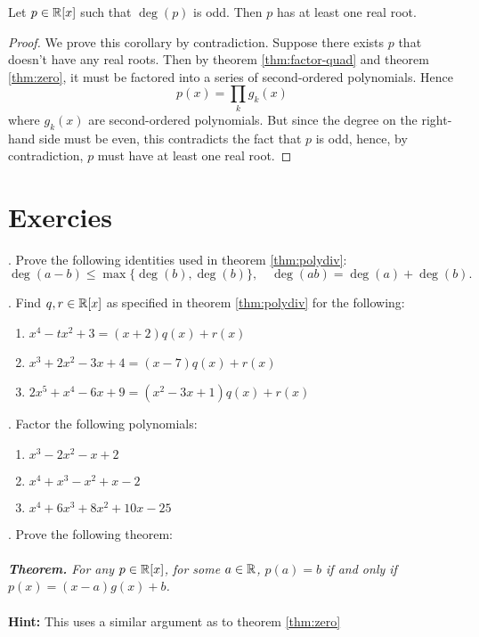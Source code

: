 \begin{cor}
Let $p\in\mathbb{R}[x]$ such that $\deg(p)$ is odd. Then $p$ has at least one real root.
\end{cor}
\begin{proof}
	We prove this corollary by contradiction. Suppose there exists $p$ that doesn't have any real roots.
	Then by theorem \eqref{thm:factor-quad} and theorem \eqref{thm:zero}, it must be factored into a series of second-ordered polynomials.
	Hence
	$$p(x)=\prod_k g_k(x)$$
	where $g_k(x)$ are second-ordered polynomials.
	But since the degree on the right-hand side must be even, this contradicts the fact that $p$ is odd, hence, by contradiction, $p$ must have at least one real root. 
\end{proof}

\section{Exercies}
. Prove the following identities used in theorem \eqref{thm:polydiv}:
$$\deg(a-b)\le \max\{\deg(b),\deg(b)\},\quad \deg(ab)=\deg(a)+\deg(b).$$

. Find $q, r\in\mathbb{R}[x]$ as specified in theorem \eqref{thm:polydiv} for the following:
\begin{enumerate}[label=\alph*)]
	\item $x^4-tx^2+3 = (x+2)q(x)+r(x)$
	\item $x^3+2x^2-3x+4 = (x-7)q(x)+r(x)$
	\item $2x^5+x^4-6x+9 = (x^2-3x+1)q(x)+r(x)$
\end{enumerate}

. Factor the following polynomials:
\begin{enumerate}[label=\alph*)]
	\item $x^3-2 x^2-x+2$
	\item $x^4+x^3-x^2+x-2$
	\item $x^4+6 x^3+8 x^2+10 x-25$
\end{enumerate}


. Prove the following theorem:\\\\
\indent
\textit{\textbf{Theorem.} For any $p\in \mathbb{R}[x]$, for some $a\in\mathbb{R}$,
	$p(a)=b$ if and only if $p(x)=(x-a)g(x)+b$.}\\\\
\textbf{Hint:} This uses a similar argument as to theorem \eqref{thm:zero}

